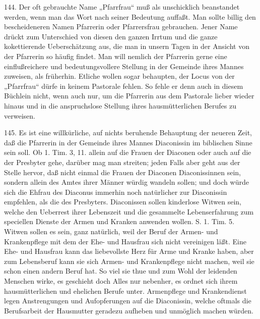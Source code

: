 144. Der oft gebrauchte Name „Pfarrfrau“ muß als unschicklich beanstandet werden, wenn man das Wort nach seiner Bedeutung auffaßt. Man sollte billig den bescheideneren Namen Pfarrerin oder Pfarrersfrau gebrauchen. Jener Name drückt zum Unterschied von diesen den ganzen Irrtum und die ganze kokettierende Ueberschätzung aus, die man in unsern Tagen in der Ansicht von der Pfarrerin so häufig findet. Man will nemlich der Pfarrerin gerne eine einflußreichere und bedeutungsvollere Stellung in der Gemeinde ihres Mannes zuweisen, als früherhin. Etliche wollen sogar behaupten, der Locus von der „Pfarrfrau“ dürfe in keinem Pastorale fehlen. So fehle er denn auch in diesem Büchlein nicht, wenn auch nur, um die Pfarrerin aus dem Pastorale lieber wieder hinaus und in die anspruchslose Stellung ihres hausmütterlichen Berufes zu verweisen.

145. Es ist eine willkürliche, auf nichts beruhende Behauptung der neueren Zeit, daß die Pfarrerin in der Gemeinde ihres Mannes Diaconissin im biblischen Sinne sein soll. Ob 1. Tim. 3, 11. allein auf die Frauen der Diaconen oder auch auf die der Presbyter gehe, darüber mag man streiten; jeden Falls aber geht aus der Stelle hervor, daß nicht einmal die Frauen der Diaconen Diaconissinnen sein, sondern allein des Amtes ihrer Männer würdig wandeln sollen; und doch würde sich die Ehfrau des Diaconus
immerhin noch natürlicher zur Diaconissin empfehlen, als die des Presbyters. Diaconissen sollen kinderlose Witwen sein, welche den Ueberrest ihrer Lebenszeit und die gesammelte Lebenserfahrung zum speciellen Dienste der Armen und Kranken anwenden wollen. S. 1. Tim. 5. Witwen sollen es sein, ganz natürlich, weil der Beruf der Armen- und Krankenpflege mit dem der Ehe- und Hausfrau sich nicht vereinigen läßt. Eine Ehe- und Hausfrau kann das liebevollste Herz für Arme und Kranke haben, aber zum Lebensberuf kann sie sich Armen- und Krankenpflege nicht machen, weil sie schon einen andern Beruf hat. So viel sie thue und zum Wohl der leidenden Menschen wirke, es geschieht doch Alles nur nebenher, es ordnet sich ihrem hausmütterlichen und ehelichen Berufe unter. Armenpflege und Krankendienst legen Anstrengungen und Aufopferungen auf die Diaconissin, welche oftmals die Berufsarbeit der Hausmutter geradezu aufheben und unmöglich machen würden.

